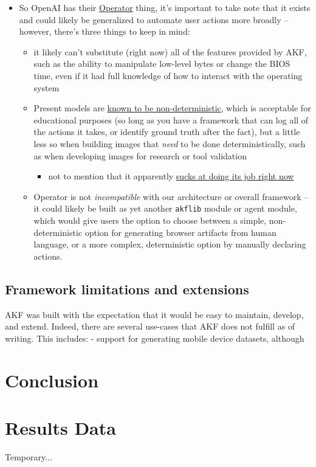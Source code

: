 \documentclass[letterpaper,12pt]{report}
\def\tightlist{}
\begin{document}
\begin{itemize}
\tightlist
\item
  So OpenAI has their
  \href{https://openai.com/index/introducing-operator/}{Operator} thing,
  it's important to take note that it exists and could likely be
  generalized to automate user actions more broadly -- however, there's
  three things to keep in mind:

  \begin{itemize}
  \tightlist
  \item
    it likely can't substitute (right now) all of the features provided
    by AKF, such as the ability to manipulate low-level bytes or change
    the BIOS time, even if it had full knowledge of how to interact with
    the operating system
  \item
    Present models are
    \href{https://152334h.github.io/blog/non-determinism-in-gpt-4/}{known
    to be non-deterministic}, which is acceptable for educational
    purposes (so long as you have a framework that can log all of the
    actions it takes, or identify ground truth after the fact), but a
    little less so when building images that \emph{need} to be done
    deterministically, such as when developing images for research or
    tool validation

    \begin{itemize}
    \tightlist
    \item
      not to mention that it apparently
      \href{https://www.reddit.com/r/ChatGPTPro/comments/1i8jln3/i_am_among_the_first_people_to_gain_access_to/}{sucks
      at doing its job right now}
    \end{itemize}
  \item
    Operator is not \emph{incompatible} with our architecture or overall
    framework -- it could likely be built as yet another \texttt{akflib}
    module or agent module, which would give users the option to choose
    between a simple, non-deterministic option for generating browser
    artifacts from human language, or a more complex, deterministic
    option by manually declaring actions.
  \end{itemize}
\end{itemize}

\section{Framework limitations and
extensions}\label{framework-limitations-and-extensions}

AKF was built with the expectation that it would be easy to maintain,
develop, and extend. Indeed, there are several use-cases that AKF does
not fulfill as of writing. This includes: - support for generating
mobile device datasets, although

\chapter{Conclusion}\label{chapter-nine}





\printglossary[type=\acronymtype]
\printglossary


\appendix

\chapter{Results Data} \label{appendix-B}
Temporary...
\end{document}

